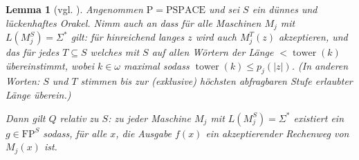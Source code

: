 \documentclass[nofonts]{uebung}
\newtheorem{lemma}[theorem]{Lemma}
\theoremstyle{definition}
\def\P{\ensuremath{\mathrm{P}}}
\def\FP{\ensuremath{\mathrm{FP}}}
\def\PSPACE{\ensuremath{\mathrm{PSPACE}}}
\DeclareMathOperator{\tower}{tower}
\begin{document}
\begin{lemma}[vgl. \cite{fortnow_separability_2002}]\label{thm:q-algorithmus}
    Angenommen $\P=\PSPACE$ und sei $S$ ein dünnes und lückenhaftes Orakel. %
    Nimm auch an dass für alle Maschinen $M_j$ mit $L(M_j^S)=\Sigma^*$ gilt: für hinreichend langes $z$ wird auch $M_j^T(z)$ akzeptieren, und das für jedes $T\subseteq S$ welches mit $S$ auf allen Wörtern der Länge $<\tower(k)$ übereinstimmt, wobei $k\in\omega$ maximal sodass $\tower(k)\leq p_j(|z|)$.
    (In anderen Worten: $S$ und $T$ stimmen bis zur (exklusive) höchsten abfragbaren Stufe erlaubter Länge überein.)

    Dann gilt $Q$ relativ zu $S$: zu jeder Maschine $M_j$ mit $L(M_j^S)=\Sigma^*$ existiert ein $g\in\FP^S$ sodass, für alle $x$, die Ausgabe $f(x)$ ein akzeptierender Rechenweg von $M_j(x)$ ist. 
\end{lemma}
\end{document}

